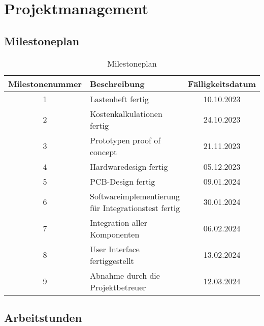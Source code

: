 \documentclass[titlepage,12pt,twoside]{article}
\begin{document}
\newpage
\section{Projektmanagement}
\subsection{Milestoneplan}
\begin{table}[H]
    \centering
    \begin{tabular}{|c|l|c|}  %
        \hline
        \textbf{Milestonenummer} & \textbf{Beschreibung} & \textbf{Fälligkeitsdatum} \\
        \hline
        1 & Lastenheft fertig & 10.10.2023 \\
		\hline
        2 & Kostenkalkulationen fertig & 24.10.2023 \\
		\hline
        3 & Prototypen proof of concept & 21.11.2023 \\
		\hline
        4 & Hardwaredesign fertig & 05.12.2023 \\
		\hline
        5 & PCB-Design fertig & 09.01.2024 \\
		\hline
        6 & Softwareimplementierung für Integrationstest fertig & 30.01.2024 \\
		\hline
        7 & Integration aller Komponenten & 06.02.2024 \\
		\hline
        8 & User Interface fertiggestellt & 13.02.2024 \\
		\hline
        9 & Abnahme durch die Projektbetreuer & 12.03.2024 \\
        \hline
    \end{tabular}
    \caption{Milestoneplan}
    \label{tab:Milestoneplan}
\end{table}

\newpage
\subsection{Arbeitstunden}
\end{document}

